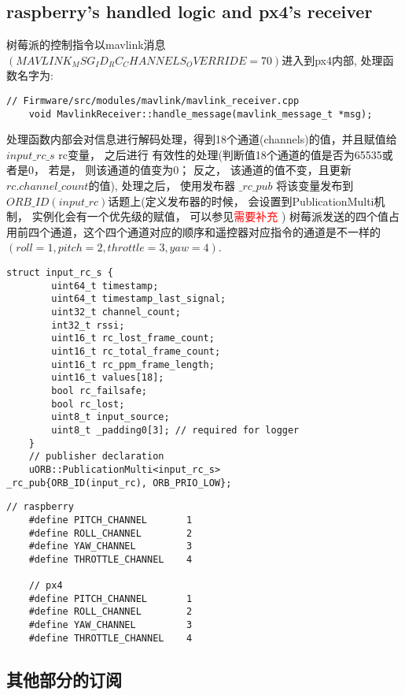 \subsection{raspberry's handled logic and px4's receiver}
树莓派的控制指令以mavlink消息$(MAVLINK_MSG_ID_RC_CHANNELS_OVERRIDE = 70)$进入到px4内部, 处理函数名字为:
\begin{lstlisting}[title=mavlink处理函数声明体]
    // Firmware/src/modules/mavlink/mavlink_receiver.cpp
    void MavlinkReceiver::handle_message(mavlink_message_t *msg);
\end{lstlisting}
\par 处理函数内部会对信息进行解码处理，得到18个通道(channels)的值，并且赋值给 $input\_rc\_s$ rc{}变量， 之后进行
有效性的处理(判断值18个通道的值是否为65535或者是0， 若是， 则该通道的值变为0； 反之， 该通道的值不变，且更新$rc.channel\_count$的值),
处理之后， 使用发布器 $\_rc\_pub$ 将该变量发布到$ORB\_ID(input\_rc)$话题上(定义发布器的时候， 会设置到PublicationMulti机制， 实例化会有一个优先级的赋值， 可以参见\textcolor{red}{需要补充} )
树莓派发送的四个值占用前四个通道，这个四个通道对应的顺序和遥控器对应指令的通道是不一样的 $(roll = 1 , pitch = 2, throttle = 3, yaw = 4)$.
\begin{lstlisting}[title=$input\_rc\_s$结构体的定义]
    struct input_rc_s {
        uint64_t timestamp;
        uint64_t timestamp_last_signal;
        uint32_t channel_count;
        int32_t rssi;
        uint16_t rc_lost_frame_count;
        uint16_t rc_total_frame_count;
        uint16_t rc_ppm_frame_length;
        uint16_t values[18];
        bool rc_failsafe;
        bool rc_lost;
        uint8_t input_source;
        uint8_t _padding0[3]; // required for logger
    }
    // publisher declaration 
    uORB::PublicationMulti<input_rc_s>			_rc_pub{ORB_ID(input_rc), ORB_PRIO_LOW};
\end{lstlisting}
\begin{lstlisting}[title=树莓派以及固件通道定义]
    // raspberry
    #define PITCH_CHANNEL 		1
    #define ROLL_CHANNEL 		2
    #define YAW_CHANNEL 		3
    #define THROTTLE_CHANNEL 	4
    
    // px4
    #define PITCH_CHANNEL 		1
    #define ROLL_CHANNEL 		2
    #define YAW_CHANNEL 		3
    #define THROTTLE_CHANNEL 	4
\end{lstlisting}

\subsection{其他部分的订阅}

